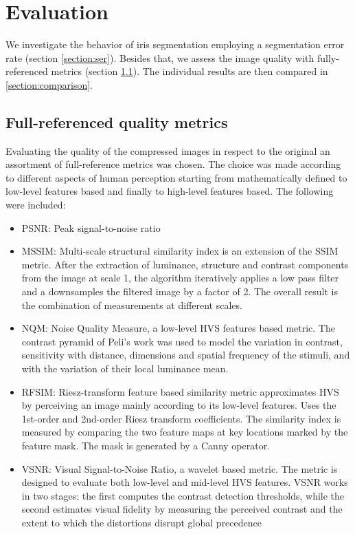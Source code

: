 \documentclass[10pt,twocolumn,letterpaper]{article}
\begin{document}
\section{Evaluation}
\label{section:eval}
 We investigate the behavior of iris segmentation employing a segmentation error rate (section \ref{section:ser}). Besides that, we assess the image quality with fully-referenced metrics (section \ref{section:fulRef}). The individual results are then compared in \ref{section:comparison}.


\subsection{Full-referenced quality metrics}
\label{section:fulRef}
Evaluating the quality of the compressed images in respect to the original an assortment of full-reference metrics was chosen. The choice was made according to different aspects of human perception starting from mathematically defined to low-level features based and finally to high-level features based. The following were included: 
 
\begin{itemize}
 \item PSNR: Peak signal-to-noise ratio
 \item MSSIM\cite{Wangsa}: Multi-scale structural similarity index  is an extension of the SSIM metric. After the extraction of luminance, structure and contrast components from the image at scale 1, the algorithm iteratively applies a low pass filter and a downsamples the
 filtered image by a factor of 2. The overall result is the combination of measurements at different scales.
 \item NQM\cite{Dameraa}: Noise Quality Measure, a low-level HVS features based metric. The contrast pyramid of Peli’s work was used to model the variation in contrast, sensitivity with distance, dimensions and spatial frequency of the stimuli, and with the variation of their local luminance mean.
 \item RFSIM\cite{Zhanga}: Riesz-transform feature based similarity metric approximates HVS by perceiving an image mainly according to its low-level features. Uses the 1st-order and 2nd-order Riesz transform coefficients. The similarity index is measured by comparing the two feature maps at key locations marked by the feature mask. The mask is generated by a Canny operator.
 \item VSNR\cite{Chandlera}: Visual Signal-to-Noise Ratio, a wavelet based
 metric. The metric is designed to evaluate both low-level and
 mid-level HVS features. VSNR works in two stages: the first computes the contrast detection thresholds, while the second estimates visual fidelity by measuring the perceived contrast and the extent to which
 the distortions disrupt global precedence
 
\end{itemize}
\end{document}
